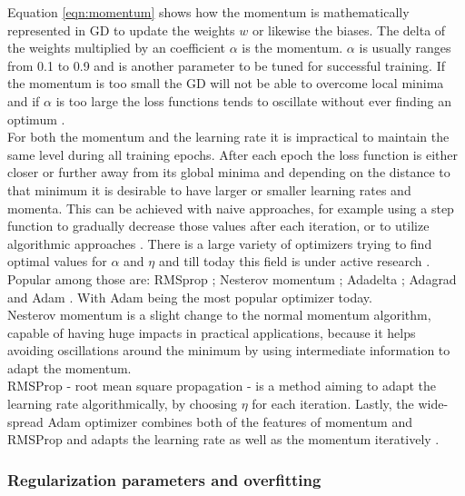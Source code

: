 Equation \ref{eqn:momentum} shows how the momentum is mathematically represented in GD to
update the weights $w$ or likewise the biases. The delta of the weights multiplied by an
coefficient $\alpha$ is the momentum. $\alpha$ is usually ranges from 0.1 to 0.9 and is
another parameter to be tuned for successful training. If the momentum is too small the GD
will not be able to overcome local minima and if $\alpha$ is too large the loss functions tends to oscillate without ever finding an optimum \cite{lecun2015deep}. \\
For both the momentum and the learning rate it is impractical to maintain the same level
during all training epochs. After each epoch the loss function is either closer or further
away from its global minima and depending on the distance to that minimum it is desirable
to have larger or smaller learning rates and momenta. This can be achieved with naive
approaches, for example using a step function to gradually decrease those values after
each iteration, or to utilize algorithmic approaches \cite{michie1994machine}. There is a
large variety of optimizers trying to find optimal values for $\alpha$ and $\eta$ and till
today this field is under active research \cite{goodfellow2016deep}. Popular among those
are: RMSprop \cite{hinton2012neural}; Nesterov momentum \cite{dozat2016incorporating};
Adadelta \cite{zeiler2012adadelta}; Adagrad \cite{ruder2016overview} and Adam
\cite{kingma2014adam}. With Adam being the most popular
optimizer today. \\
Nesterov momentum is a slight change to the normal momentum algorithm, capable of having huge impacts in practical applications, because it helps avoiding oscillations around the minimum by using intermediate information to adapt the momentum. \\
RMSProp - root mean square propagation - is a method aiming to adapt the learning rate
algorithmically, by choosing $\eta$ for each iteration. Lastly, the wide-spread Adam
optimizer combines both of the features of momentum and RMSProp and adapts the learning
rate as well as the momentum iteratively \cite{kingma2014adam}.

\subsubsection{Regularization parameters and overfitting}

